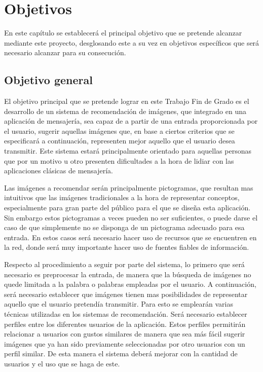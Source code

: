 \chapter{Objetivos}
\label{chap:objetivos}

\noindent
En este capítulo se establecerá el principal objetivo que se pretende alcanzar mediante este proyecto, desglosando este a su vez en objetivos específicos que será necesario alcanzar para su consecución.

\section{Objetivo general}

El objetivo principal que se pretende lograr en este Trabajo Fin de Grado es el desarrollo de un sistema de recomendación de imágenes, que integrado en una aplicación de mensajería, sea capaz de a partir de una entrada proporcionada por el usuario, sugerir aquellas imágenes que, en base a ciertos criterios que se especificará a continuación, representen mejor aquello que el usuario desea transmitir. Este sistema estará principalmente orientado para aquellas personas que por un motivo u otro presenten dificultades a la hora de lidiar con las aplicaciones clásicas de mensajería.

Las imágenes a recomendar serán principalmente pictogramas, que resultan mas intuitivos que las imágenes tradicionales a la hora de representar conceptos, especialmente para gran parte del público para el que se diseña esta aplicación. Sin embargo estos pictogramas a veces pueden no ser suficientes, o puede darse el caso de que simplemente no se disponga de un pictograma adecuado para esa entrada. En estos casos será necesario hacer uso de recursos que se encuentren en la red, donde será muy importante hacer uso de fuentes fiables de información.

Respecto al procedimiento a seguir por parte del sistema, lo primero que será necesario es preprocesar la entrada, de manera que la búsqueda de imágenes no quede limitada a la palabra o palabras empleadas por el usuario. A continuación, será necesario establecer que imágenes tienen mas posibilidades de representar aquello que el usuario pretendía transmitir. Para esto se emplearán varias técnicas utilizadas en los sistemas de recomendación. Será necesario establecer perfiles entre los diferentes usuarios de la aplicación. Estos perfiles permitirán relacionar a usuarios con gustos similares de manera que sea más fácil sugerir imágenes que ya han sido previamente seleccionadas por otro usuarios con un perfil similar. De esta manera el sistema deberá mejorar con la cantidad de usuarios y el uso que se haga de este.

